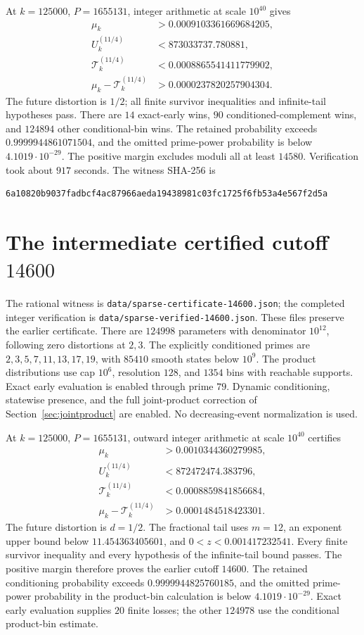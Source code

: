 \documentclass[11pt]{article}
\begin{document}
At $k=125000$, $P=1655131$, integer arithmetic at scale $10^{40}$ gives
\begin{align*}
 \mu_k&>0.0009103361669684205,\\
 U_k^{(11/4)}&<873033737.780881,\\
 \mathcal T_k^{(11/4)}&<0.0008865541411779902,\\
 \mu_k-\mathcal T_k^{(11/4)}&>0.0000237820257904304.
\end{align*}
The future distortion is $1/2$; all finite survivor inequalities and
infinite-tail hypotheses pass. There are $14$ exact-early wins, $90$
conditioned-complement wins, and $124894$ other conditional-bin wins.
The retained probability exceeds $0.9999944861071504$, and the omitted
prime-power probability is below $4.1019\cdot10^{-29}$.
The positive margin excludes moduli all at least $14580$. Verification took
about $917$ seconds. The witness SHA-256 is
\begin{lstlisting}[basicstyle=\ttfamily\scriptsize,breaklines=true]
6a10820b9037fadbcf4ac87966aeda19438981c03fc1725f6fb53a4e567f2d5a
\end{lstlisting}

\section{The intermediate certified cutoff $14600$}\label{sec:14600}
The rational witness is \texttt{data/sparse-certificate-14600.json};
the completed integer verification is \texttt{data/sparse-verified-14600.json}.
These files preserve the earlier certificate.
There are $124998$ parameters with denominator $10^{12}$, following zero
distortions at $2,3$. The explicitly conditioned primes are
$2,3,5,7,11,13,17,19$, with $85410$ smooth states below $10^9$.
The product distributions use cap $10^6$, resolution $128$, and $1354$
bins with reachable supports. Exact early evaluation is enabled through
prime $79$. Dynamic conditioning, statewise presence, and the full
joint-product correction of Section~\ref{sec:jointproduct} are enabled.
No decreasing-event normalization is used.

At $k=125000$, $P=1655131$, outward integer arithmetic at scale $10^{40}$
certifies
\begin{align*}
 \mu_k&>0.0010344360279985,\\
 U_k^{(11/4)}&<872472474.383796,\\
 \mathcal T_k^{(11/4)}&<0.0008859841856684,\\
 \mu_k-\mathcal T_k^{(11/4)}&>0.0001484518423301.
\end{align*}
The future distortion is $d=1/2$. The fractional tail uses $m=12$,
an exponent upper bound below $11.454363405601$, and
$0<z<0.001417232541$. Every finite survivor inequality and every hypothesis
of the infinite-tail bound passes. The positive margin therefore proves
the earlier cutoff $14600$. The retained conditioning probability exceeds
$0.9999944825760185$, and the omitted prime-power probability in the
product-bin calculation is below $4.1019\cdot10^{-29}$.
Exact early evaluation supplies $20$ finite losses; the other $124978$
use the conditional product-bin estimate.
\end{document}

